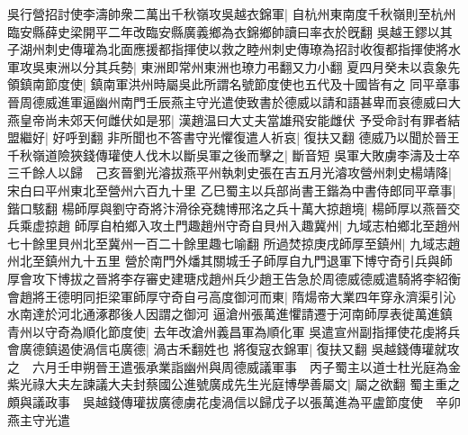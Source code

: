 吳行營招討使李濤帥衆二萬出千秋嶺攻吳越衣錦軍|{
	自杭州東南度千秋嶺則至杭州臨安縣薛史梁開平二年改臨安縣廣義鄉為衣錦鄉帥讀曰率衣於旣翻}
吳越王鏐以其子湖州刺史傳瓘為北面應援都指揮使以救之睦州刺史傳璙為招討收復都指揮使將水軍攻吳東洲以分其兵勢|{
	東洲即常州東洲也璙力弔翻又力小翻}
夏四月癸未以袁象先領鎮南節度使|{
	鎮南軍洪州時屬吳此所謂名號節度使也五代及十國皆有之}
同平章事　晉周德威進軍逼幽州南門壬辰燕主守光遣使致書於德威以請和語甚卑而哀德威曰大燕皇帝尚未郊天何雌伏如是邪|{
	漢趙温曰大丈夫當雄飛安能雌伏}
予受命討有罪者結盟繼好|{
	好呼到翻}
非所聞也不答書守光懼復遣人祈哀|{
	復扶又翻}
德威乃以聞於晉王　千秋嶺道險狹錢傳瓘使人伐木以斷吳軍之後而擊之|{
	斷音短}
吳軍大敗虜李濤及士卒三千餘人以歸　己亥晉劉光濬拔燕平州執刺史張在吉五月光濬攻營州刺史楊靖降|{
	宋白曰平州東北至營州六百九十里}
乙巳蜀主以兵部尚書王鍇為中書侍郎同平章事|{
	鍇口駭翻}
楊師厚與劉守奇將汴滑徐兗魏博邢洺之兵十萬大掠趙境|{
	楊師厚以燕晉交兵乘虚掠趙}
師厚自柏鄉入攻土門趣趙州守奇自貝州入趣冀州|{
	九域志柏鄉北至趙州七十餘里貝州北至冀州一百二十餘里趣七喻翻}
所過焚掠庚戌師厚至鎮州|{
	九域志趙州北至鎮州九十五里}
營於南門外燔其關城壬子師厚自九門退軍下博守奇引兵與師厚會攻下博拔之晉將李存審史建瑭戍趙州兵少趙王告急於周德威德威遣騎將李紹衡會趙將王德明同拒梁軍師厚守奇自弓高度御河而東|{
	隋煬帝大業四年穿永濟渠引沁水南達於河北通涿郡後人因謂之御河}
逼滄州張萬進懼請遷于河南師厚表徙萬進鎮青州以守奇為順化節度使|{
	去年改滄州義昌軍為順化軍}
吳遣宣州副指揮使花虔將兵會廣德鎮遏使渦信屯廣德|{
	渦古禾翻姓也}
將復寇衣錦軍|{
	復扶又翻}
吳越錢傳瓘就攻之　六月壬申朔晉王遣張承業詣幽州與周德威議軍事　丙子蜀主以道士杜光庭為金紫光祿大夫左諫議大夫封蔡國公進號廣成先生光庭博學善屬文|{
	屬之欲翻}
蜀主重之頗與議政事　吳越錢傳瓘拔廣德虜花虔渦信以歸戊子以張萬進為平盧節度使　辛卯燕主守光遣

